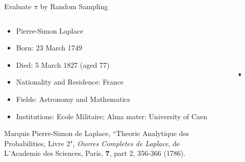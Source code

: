 \documentclass[xcolor=x11names,compress]{beamer}
\renewcommand{\(}{\begin{columns}}
\renewcommand{\)}{\end{columns}}
\newcommand{\<}[1]{\begin{column}{#1}}
\renewcommand{\>}{\end{column}}
\begin{document}
\begin{frame}{Evaluate $\pi$ by Random Sampling}

\begin{columns}
  \begin{column}{0.6\textwidth}
    \begin{itemize}
    \item Pierre-Simon Laplace 
    \item Born: 23 March 1749
    \item Died: 5 March 1827 (aged 77)
    \item Nationality and Residence: France
    \item Fields: Astronomy and Mathematics
    \item Institutions: Ecole Militaire; Alma mater: University of Caen
    \end{itemize}
    \vspace*{0.5 em}
    Marquis Pierre-Simon de Laplace, ``Theorie Analytique des Probabilities, Livre 2",  \textit{Ouvres Completes de Laplace}, de L'Academie des Sciences, Paris, \textbf{7}, part 2, 356-366 (1786).
  \end{column}
  \begin{column}{0.4\textwidth}
  	\begin{figure}
  	\begin{center}
  		\includegraphics[height=2in,clip]{laplace}
	\end{center}
  	\end{figure}
  \end{column}
\end{columns}
\end{frame}
\end{document}
